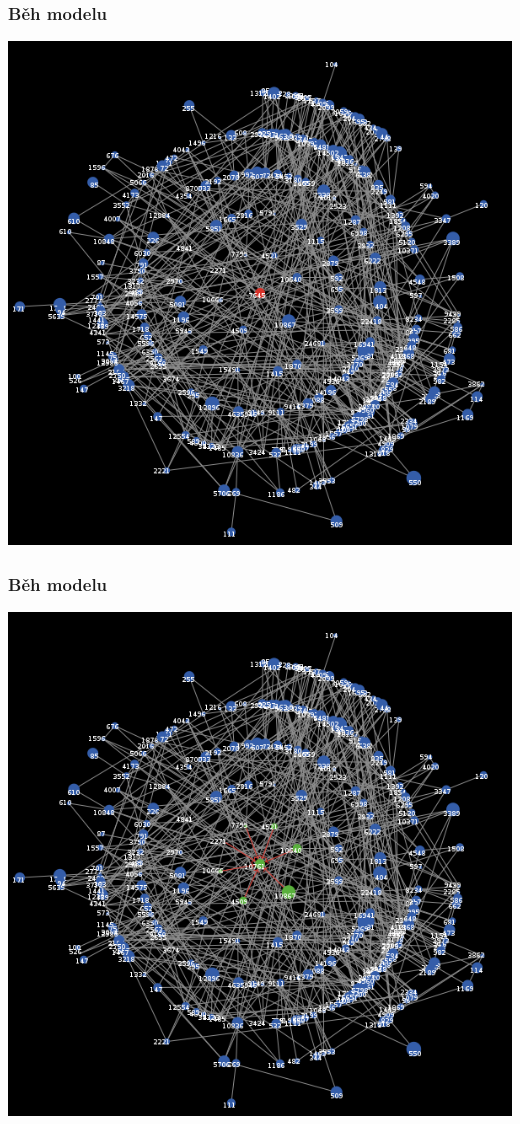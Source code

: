 \documentclass[xcolor=dvipsnames]{beamer}
\begin{document}
  \begin{frame}
    \frametitle{Běh modelu}
    \includegraphics[width=0.6\paperwidth]{0.png}
  \end{frame}
    \begin{frame}
    \frametitle{Běh modelu}
    \includegraphics[width=0.6\paperwidth]{1.png}
  \end{frame}
\end{document}
